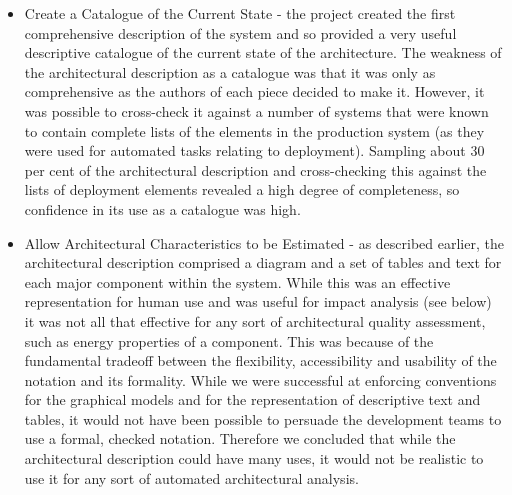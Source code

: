 \begin{itemize}

\item Create a Catalogue of the Current State - the project created the first comprehensive description of the system and so provided a very useful descriptive catalogue of the current state of the architecture.  The weakness of the architectural description as a catalogue was that it was only as comprehensive as the authors of each piece decided to make it.  However, it was possible to cross-check it against a number of systems that were known to contain complete lists of the elements in the production system (as they were used for automated tasks relating to deployment).  Sampling about 30 per cent of the architectural description and cross-checking this against the lists of deployment elements revealed a high degree of completeness, so confidence in its use as a catalogue was high.

\item Allow Architectural Characteristics to be Estimated - as described earlier, the architectural description comprised a diagram and a set of tables and text for each major component within the system.  While this was an effective representation for human use and was useful for impact analysis (see below) it was not all that effective for any sort of architectural quality assessment, such as energy properties of a component.  This was because of the fundamental tradeoff between the flexibility, accessibility and usability of the notation and its formality.  While we were successful at enforcing conventions for the graphical models and for the representation of descriptive text and tables, it would not have been possible to persuade the development teams to use a formal,  checked notation.  Therefore we concluded that while the architectural description could have many uses, it would not be realistic to use it for any sort of automated architectural analysis.


\end{itemize}
